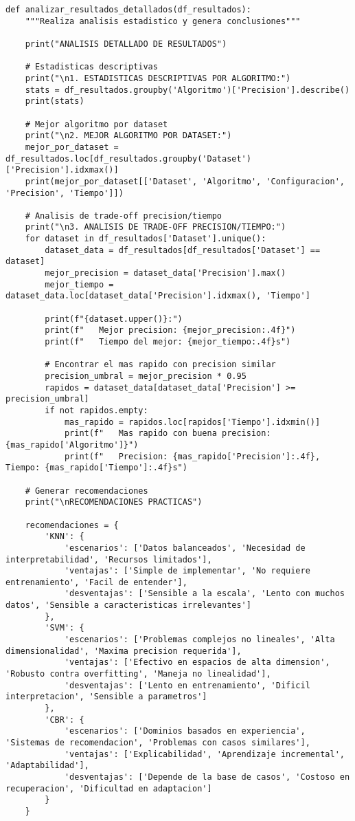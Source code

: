 \documentclass[12pt]{article}
\begin{document}
\begin{lstlisting}
def analizar_resultados_detallados(df_resultados):
    """Realiza analisis estadistico y genera conclusiones"""
    
    print("ANALISIS DETALLADO DE RESULTADOS")
    
    # Estadisticas descriptivas
    print("\n1. ESTADISTICAS DESCRIPTIVAS POR ALGORITMO:")
    stats = df_resultados.groupby('Algoritmo')['Precision'].describe()
    print(stats)
    
    # Mejor algoritmo por dataset
    print("\n2. MEJOR ALGORITMO POR DATASET:")
    mejor_por_dataset = df_resultados.loc[df_resultados.groupby('Dataset')['Precision'].idxmax()]
    print(mejor_por_dataset[['Dataset', 'Algoritmo', 'Configuracion', 'Precision', 'Tiempo']])
    
    # Analisis de trade-off precision/tiempo
    print("\n3. ANALISIS DE TRADE-OFF PRECISION/TIEMPO:")
    for dataset in df_resultados['Dataset'].unique():
        dataset_data = df_resultados[df_resultados['Dataset'] == dataset]
        mejor_precision = dataset_data['Precision'].max()
        mejor_tiempo = dataset_data.loc[dataset_data['Precision'].idxmax(), 'Tiempo']
        
        print(f"{dataset.upper()}:")
        print(f"   Mejor precision: {mejor_precision:.4f}")
        print(f"   Tiempo del mejor: {mejor_tiempo:.4f}s")
        
        # Encontrar el mas rapido con precision similar
        precision_umbral = mejor_precision * 0.95
        rapidos = dataset_data[dataset_data['Precision'] >= precision_umbral]
        if not rapidos.empty:
            mas_rapido = rapidos.loc[rapidos['Tiempo'].idxmin()]
            print(f"   Mas rapido con buena precision: {mas_rapido['Algoritmo']}")
            print(f"   Precision: {mas_rapido['Precision']:.4f}, Tiempo: {mas_rapido['Tiempo']:.4f}s")
    
    # Generar recomendaciones
    print("\nRECOMENDACIONES PRACTICAS")
    
    recomendaciones = {
        'KNN': {
            'escenarios': ['Datos balanceados', 'Necesidad de interpretabilidad', 'Recursos limitados'],
            'ventajas': ['Simple de implementar', 'No requiere entrenamiento', 'Facil de entender'],
            'desventajas': ['Sensible a la escala', 'Lento con muchos datos', 'Sensible a caracteristicas irrelevantes']
        },
        'SVM': {
            'escenarios': ['Problemas complejos no lineales', 'Alta dimensionalidad', 'Maxima precision requerida'],
            'ventajas': ['Efectivo en espacios de alta dimension', 'Robusto contra overfitting', 'Maneja no linealidad'],
            'desventajas': ['Lento en entrenamiento', 'Dificil interpretacion', 'Sensible a parametros']
        },
        'CBR': {
            'escenarios': ['Dominios basados en experiencia', 'Sistemas de recomendacion', 'Problemas con casos similares'],
            'ventajas': ['Explicabilidad', 'Aprendizaje incremental', 'Adaptabilidad'],
            'desventajas': ['Depende de la base de casos', 'Costoso en recuperacion', 'Dificultad en adaptacion']
        }
    }
    

\end{lstlisting}
\end{document}
